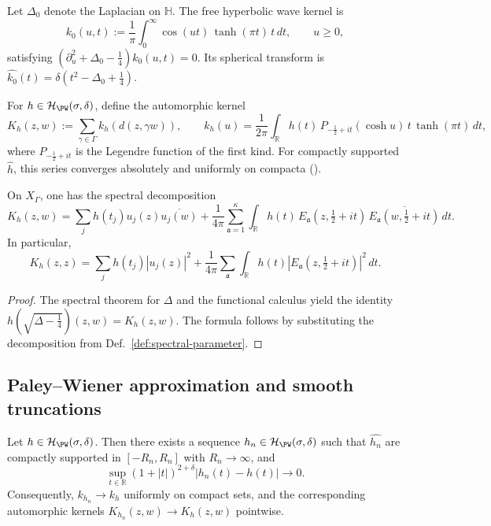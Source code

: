 \begin{definition}
\label{def:wave-kernel-hyperbolic}
Let $\Delta_0$ denote the Laplacian on $\mathbb{H}$. The free hyperbolic wave kernel is
\[
k_0(u,t) := \frac{1}{\pi} \int_{0}^{\infty} \cos(ut)\, \tanh(\pi t)\, t\, dt, \qquad u\ge 0,
\]
satisfying $(\partial_u^2 + \Delta_0 - \tfrac14)k_0(u,t)=0$. Its spherical transform is $\widehat{k_0}(t)=\delta(t^2 - \Delta_0+\tfrac14)$. \relax
\end{definition}

\begin{definition}
\label{def:automorphic-kernel}
For $h\in \mathcal{H}_{\PW}(\sigma,\delta)$, define the automorphic kernel
\[
  K_h(z,w) := \sum_{\gamma\in\Gamma} k_h(d(z,\gamma w)),\qquad k_h(u) = \frac{1}{2\pi}\int_{\mathbb{R}} h(t)\,P_{-\frac12+it}(\cosh u)\,t\,\tanh(\pi t)\,dt,
\]
where $P_{-\frac12+it}$ is the Legendre function of the first kind. For compactly supported $\widehat{h}$, this series converges absolutely and uniformly on compacta (\cite[§6.1]{Hejhal1983vol2}). \relax
\end{definition}

\begin{lemma}
\label{lem:spectral-expansion-Kh}
On $X_\Gamma$, one has the spectral decomposition
\[
K_h(z,w) = \sum_{j} h(t_j) u_j(z)\overline{u_j(w)} +
\frac{1}{4\pi}\sum_{\mathfrak a=1}^{\kappa}\int_{\mathbb{R}} h(t)\,
E_{\mathfrak a}(z,\tfrac12+it)\,\overline{E_{\mathfrak a}(w,\tfrac12+it)}\,dt.
\]
In particular,
\[
K_h(z,z)=\sum_j h(t_j)|u_j(z)|^2 + \frac{1}{4\pi}\sum_{\mathfrak a}\int_{\mathbb{R}} h(t)|E_{\mathfrak a}(z,\tfrac12+it)|^2\,dt.
\]
\end{lemma}

\begin{proof}\relax
The spectral theorem for $\Delta$ and the functional calculus yield the identity
$h(\sqrt{\Delta-\frac14})(z,w)=K_h(z,w)$. The formula follows by substituting the decomposition from Def.~\ref{def:spectral-parameter}. \relax
\end{proof}

\subsection{Paley–Wiener approximation and smooth truncations}
\label{subsec:ch4-part2-PW-approximation} \relax

\begin{lemma}
\label{lem:PW-approx}
Let $h\in \mathcal{H}_{\PW}(\sigma,\delta)$. Then there exists a sequence $h_n\in\mathcal{H}_{\PW}(\sigma,\delta)$ such that $\widehat{h_n}$ are compactly supported in $[-R_n,R_n]$ with $R_n\to\infty$, and
\[
  \sup_{t\in\mathbb{R}} (1+|t|)^{2+\delta} |h_n(t)-h(t)| \to 0.
\]
Consequently, $k_{h_n}\to k_h$ uniformly on compact sets, and the corresponding automorphic kernels $K_{h_n}(z,w)\to K_h(z,w)$ pointwise. \relax
\end{lemma}

